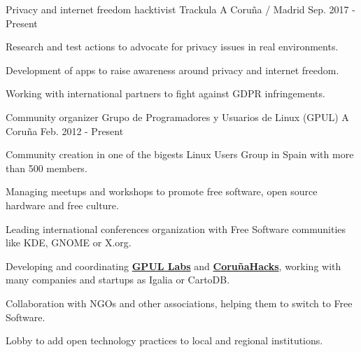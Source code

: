 


\begin{cventries}

\cventry
{Privacy and internet freedom hacktivist} %
{Trackula}  
{A Coruña / Madrid} %
{Sep. 2017 - Present} %
{ %
\begin{cvitems}
\item {Research and test actions to advocate for privacy issues in real environments.}
\item {Development of apps to raise awareness around privacy and internet freedom.}
\item {Working with international partners to fight against GDPR infringements.}
\end{cvitems}
}


\cventry
{Community organizer} %
{Grupo de Programadores y Usuarios de Linux (GPUL)} %
{A Coruña} %
{Feb. 2012 - Present} %
{ %
\begin{cvitems}
\item {Community creation in one of the bigests Linux Users Group  in Spain with more than 500 members.}
\item {Managing meetups and workshops to promote free software, open 
source hardware and free culture.}
\item {Leading international conferences organization with Free Software 
communities like KDE, GNOME or X.org.}
\item {Developing and coordinating 
\textbf{\href{http://labs.gpul.org/}{GPUL Labs}} and \textbf{\href{https://corunahacks.gpul.org/}{CoruñaHacks}}, working with many companies and startups as Igalia or CartoDB.}
\item {Collaboration with NGOs and other associations, helping them to switch to
Free Software.}
\item {Lobby to add open technology practices to local and regional institutions.}
\end{cvitems}
}


\end{cventries}
